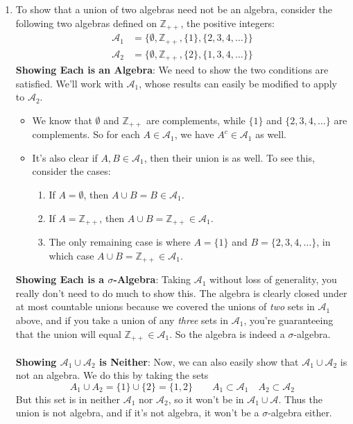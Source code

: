 \documentclass[12pt]{article}
\theoremstyle{plain}
\theoremstyle{definition}
\theoremstyle{remark}
\begin{document}
\begin{enumerate}
\begin{enumerate}
\item
    To show that a union of two algebras need not be an algebra, consider the following two algebras defined on $\mathbb{Z}_{++}$, the positive integers:
\begin{align*}
\mathscr{A}_1 
    &=\{\emptyset, \mathbb{Z}_{++}, \{1\}, \{2, 3, 4, \ldots\}\}\\
\mathscr{A}_2 
    &=\{\emptyset, \mathbb{Z}_{++}, \{2\}, \{1, 3, 4, \ldots\}\} 
\end{align*}
\textbf{Showing Each is an Algebra}: We need to show the two conditions are satisfied. We'll work with $\mathscr{A}_1$, whose results can easily be modified to apply to $\mathscr{A}_2$.
\begin{itemize}
    \item We know that $\emptyset$ and $\mathbb{Z}_{++}$ are complements, while $\{1\}$ and $\{2, 3, 4, \ldots\}$ are complements. So for each $A\in\mathscr{A}_1$, we have $A^c\in\mathscr{A}_1$ as well.

    \item It's also clear if $A, B\in\mathscr{A}_1$, then their union is as well. To see this, consider the cases:
        \begin{enumerate}
            \item If $A=\emptyset$, then $A\cup B = B\in\mathscr{A}_1$. 
            \item If $A=\mathbb{Z}_{++}$, then $A\cup B = \mathbb{Z}_{++}\in\mathscr{A}_1$.
            \item The only remaining case is where $A=\{1\}$ and $B=\{2,3,4,\ldots\}$, in which case $A\cup B = \mathbb{Z}_{++}\in\mathscr{A}_1$.
        \end{enumerate}
\end{itemize}

\textbf{Showing Each is a $\sigma$-Algebra}: Taking $\mathscr{A}_1$ without loss of generality, you really don't need to do much to show this. The algebra is clearly closed under at most countable unions because we covered the unions of \emph{two} sets in $\mathscr{A}_1$ above, and if you take a union of any \emph{three} sets in $\mathscr{A}_1$, you're guaranteeing that the union will equal $\mathbb{Z}_{++}\in\mathscr{A}_1$. So the algebra is indeed a $\sigma$-algebra.  
\\
\\
\textbf{Showing $\mathscr{A}_1\cup \mathscr{A}_2$ is Neither}: Now, we can also easily show that $\mathscr{A}_1 \cup \mathscr{A}_2$ is not an algebra. We do this by taking the sets
\[
A_1 \cup A_2 = \{1\} \cup \{2\} = \{1,2\}
\qquad A_1 \subset \mathscr{A}_1
\quad A_2 \subset \mathscr{A}_2
\]
But this set is in neither $\mathscr{A}_1$ nor $\mathscr{A}_2$,  so it won't be in $\mathscr{A}_1 \cup \mathscr{A}$. Thus the union is not algebra, and if it's not algebra, it won't be a $\sigma$-algebra either.
\end{enumerate}



\end{enumerate}
\end{document}

